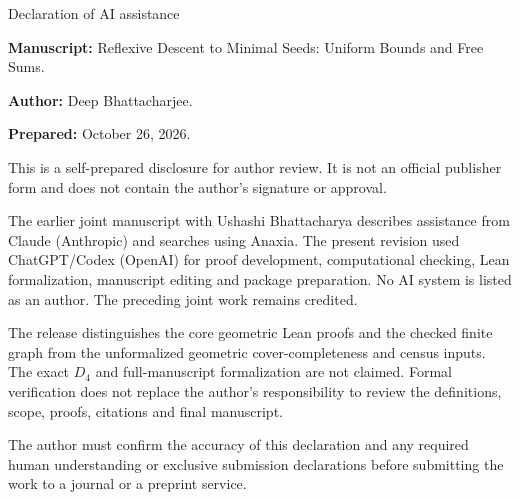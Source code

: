 \documentclass[11pt]{article}
\begin{document}
\begin{center}\Large Declaration of AI assistance\end{center}
\noindent\textbf{Manuscript:} Reflexive Descent to Minimal Seeds: Uniform Bounds and Free Sums.\par
\noindent\textbf{Author:} Deep Bhattacharjee.\par
\noindent\textbf{Prepared:} October 26, 2026.\par\bigskip
This is a self-prepared disclosure for author review. It is not an official
publisher form and does not contain the author's signature or approval.

The earlier joint manuscript with Ushashi Bhattacharya describes assistance
from Claude (Anthropic) and searches using Anaxia. The present revision used
ChatGPT/Codex (OpenAI) for proof development, computational checking, Lean
formalization, manuscript editing and package preparation. No AI system is
listed as an author. The preceding joint work remains credited.

The release distinguishes the core geometric Lean proofs and the checked
finite graph from the unformalized geometric cover-completeness and census
inputs. The exact $D_4$ and full-manuscript formalization are not claimed.
Formal verification does not replace the author's responsibility to review
the definitions, scope, proofs, citations and final manuscript.

The author must confirm the accuracy of this declaration and any required
human understanding or exclusive submission declarations before submitting
the work to a journal or a preprint service.
\end{document}

